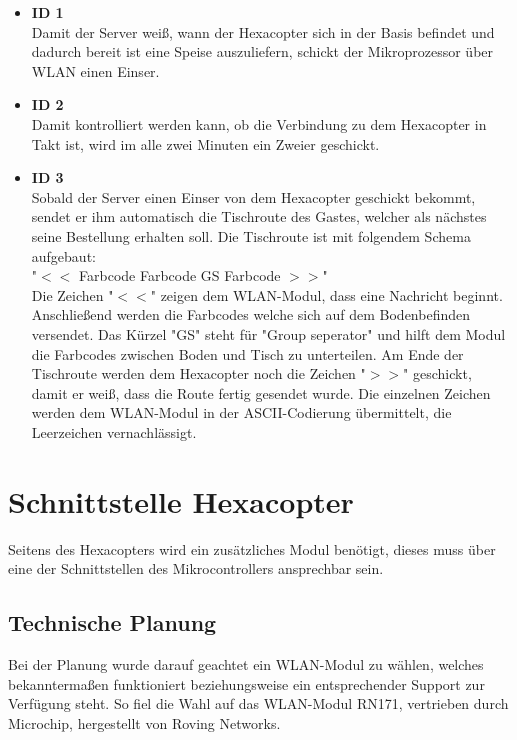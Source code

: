 \begin{itemize}
    \item \textbf{ID 1}\\
Damit der Server weiß, wann der Hexacopter sich in der Basis befindet und dadurch bereit ist eine Speise auszuliefern, schickt der Mikroprozessor über WLAN einen Einser.

    \item \textbf{ID 2}\\
Damit kontrolliert werden kann, ob die Verbindung zu dem Hexacopter in Takt ist, wird im alle zwei Minuten ein Zweier geschickt.

    \item \textbf{ID 3}\\
Sobald der Server einen Einser von dem Hexacopter geschickt bekommt, sendet er ihm automatisch die Tischroute des Gastes, welcher als nächstes seine Bestellung erhalten soll.
Die Tischroute ist mit folgendem Schema aufgebaut: \\
"$<<$ Farbcode Farbcode GS Farbcode $>>$" \\
Die Zeichen "$<<$" zeigen dem WLAN-Modul, dass eine Nachricht beginnt.
Anschließend werden die Farbcodes welche sich auf dem Bodenbefinden versendet.
Das Kürzel "GS" steht für "Group seperator" und hilft dem Modul die Farbcodes zwischen Boden und Tisch zu unterteilen.
Am Ende der Tischroute werden dem Hexacopter noch die Zeichen "$>>$" geschickt, damit er weiß, dass die Route fertig gesendet wurde.
Die einzelnen Zeichen werden dem WLAN-Modul in der ASCII-Codierung übermittelt, die Leerzeichen vernachlässigt.
  \end{itemize}

\section{Schnittstelle Hexacopter}
Seitens des Hexacopters wird ein zusätzliches Modul benötigt, dieses muss über eine der Schnittstellen des Mikrocontrollers ansprechbar sein.

  \subsection{Technische Planung}
  Bei der Planung wurde darauf geachtet ein WLAN-Modul zu wählen, welches bekanntermaßen funktioniert beziehungsweise ein entsprechender Support zur Verfügung steht.
  So fiel die Wahl auf das WLAN-Modul RN171, vertrieben durch Microchip, hergestellt von Roving Networks.

